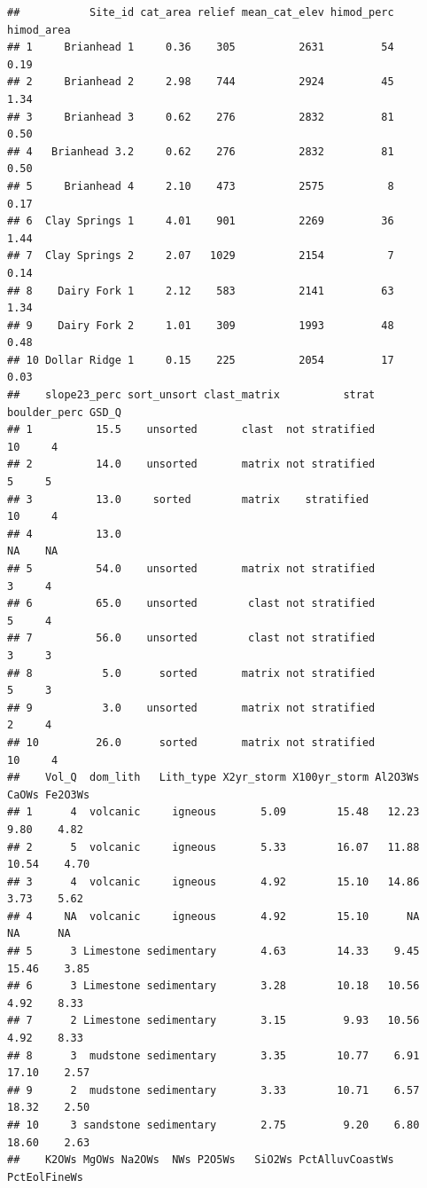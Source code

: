 \documentclass[
]{book}
\begin{document}
\begin{verbatim}
##           Site_id cat_area relief mean_cat_elev himod_perc himod_area
## 1     Brianhead 1     0.36    305          2631         54       0.19
## 2     Brianhead 2     2.98    744          2924         45       1.34
## 3     Brianhead 3     0.62    276          2832         81       0.50
## 4   Brianhead 3.2     0.62    276          2832         81       0.50
## 5     Brianhead 4     2.10    473          2575          8       0.17
## 6  Clay Springs 1     4.01    901          2269         36       1.44
## 7  Clay Springs 2     2.07   1029          2154          7       0.14
## 8    Dairy Fork 1     2.12    583          2141         63       1.34
## 9    Dairy Fork 2     1.01    309          1993         48       0.48
## 10 Dollar Ridge 1     0.15    225          2054         17       0.03
##    slope23_perc sort_unsort clast_matrix          strat boulder_perc GSD_Q
## 1          15.5    unsorted       clast  not stratified           10     4
## 2          14.0    unsorted       matrix not stratified            5     5
## 3          13.0     sorted        matrix    stratified            10     4
## 4          13.0                                                   NA    NA
## 5          54.0    unsorted       matrix not stratified            3     4
## 6          65.0    unsorted        clast not stratified            5     4
## 7          56.0    unsorted        clast not stratified            3     3
## 8           5.0      sorted       matrix not stratified            5     3
## 9           3.0    unsorted       matrix not stratified            2     4
## 10         26.0      sorted       matrix not stratified           10     4
##    Vol_Q  dom_lith   Lith_type X2yr_storm X100yr_storm Al2O3Ws CaOWs Fe2O3Ws
## 1      4  volcanic     igneous       5.09        15.48   12.23  9.80    4.82
## 2      5  volcanic     igneous       5.33        16.07   11.88 10.54    4.70
## 3      4  volcanic     igneous       4.92        15.10   14.86  3.73    5.62
## 4     NA  volcanic     igneous       4.92        15.10      NA    NA      NA
## 5      3 Limestone sedimentary       4.63        14.33    9.45 15.46    3.85
## 6      3 Limestone sedimentary       3.28        10.18   10.56  4.92    8.33
## 7      2 Limestone sedimentary       3.15         9.93   10.56  4.92    8.33
## 8      3  mudstone sedimentary       3.35        10.77    6.91 17.10    2.57
## 9      2  mudstone sedimentary       3.33        10.71    6.57 18.32    2.50
## 10     3 sandstone sedimentary       2.75         9.20    6.80 18.60    2.63
##    K2OWs MgOWs Na2OWs  NWs P2O5Ws   SiO2Ws PctAlluvCoastWs PctEolFineWs

\end{verbatim}
\end{document}
